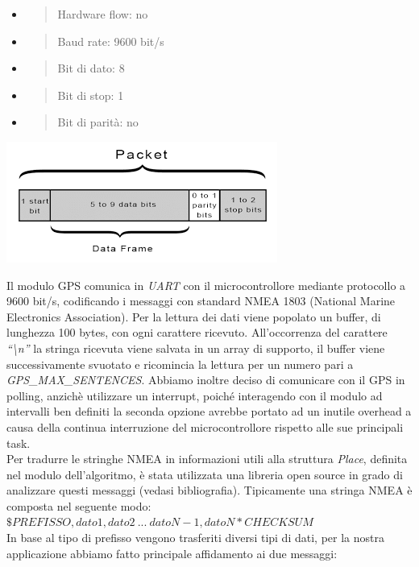 \begin{itemize}
\item
  \begin{quote}
  Hardware flow: no
  \end{quote}
\item
  \begin{quote}
  Baud rate: 9600 bit/s
  \end{quote}
\item
  \begin{quote}
  Bit di dato: 8
  \end{quote}
\item
  \begin{quote}
  Bit di stop: 1
  \end{quote}
\item
  \begin{quote}
  Bit di parità: no
  \end{quote}
\end{itemize}

\begin{center}
\includegraphics[width=3.5in,height=1.5625in]{figures/image46.png}
\captionsetup{type=figure}
\end{center}

\noindent Il modulo GPS comunica in \emph{UART} con il microcontrollore mediante
protocollo a 9600 bit/s, codificando i messaggi con standard NMEA 1803
(National Marine Electronics Association). Per la lettura dei dati viene
popolato un buffer, di lunghezza 100 bytes, con ogni carattere ricevuto.
All'occorrenza del carattere \emph{``\textbackslash n''} la stringa
ricevuta viene salvata in un array di supporto, il buffer viene
successivamente svuotato e ricomincia la lettura per un numero pari a
\emph{GPS\_MAX\_SENTENCES}. Abbiamo inoltre deciso di comunicare con il
GPS in polling, anzichè utilizzare un interrupt, poiché interagendo con
il modulo ad intervalli ben definiti la seconda opzione avrebbe portato
ad un inutile overhead a causa della continua interruzione del
microcontrollore rispetto alle sue principali task.\\
Per tradurre le stringhe NMEA in informazioni utili alla struttura
\emph{Place}, definita nel modulo dell'algoritmo, è stata utilizzata una
libreria open source in grado di analizzare questi messaggi (vedasi
bibliografia). Tipicamente una stringa NMEA è composta nel seguente
modo:\\
\(\$ PREFISSO,dato1,dato2\ ...\ datoN - 1,datoN*CHECKSUM\)\\
In base al tipo di prefisso vengono trasferiti diversi tipi di dati, per
la nostra applicazione abbiamo fatto principale affidamento ai due
messaggi:

